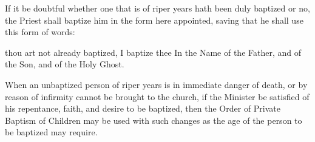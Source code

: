 \begin{leftbar}

\begin{rubric}
If it be doubtful whether one that is of riper years hath been duly baptized or no, the Priest shall baptize him in the form here appointed, saving that he shall use this form of words:
\end{rubric}

 thou art not already baptized, I baptize thee In the Name of the Father, and of the Son, and of the Holy Ghost.

\begin{rubric}
When an unbaptized person of riper years is in immediate danger of death, or by reason of infirmity cannot be brought to the church, if the Minister be satisfied of his repentance, faith, and desire to be baptized, then the Order of Private Baptism of Children may be used with such changes as the age of the person to be baptized may require.
\end{rubric}

\end{leftbar}
